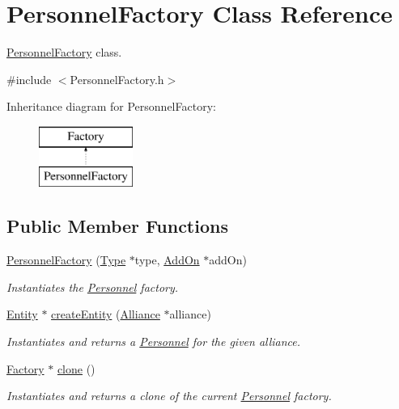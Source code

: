 \hypertarget{classPersonnelFactory}{}\section{Personnel\+Factory Class Reference}
\label{classPersonnelFactory}


\hyperlink{classPersonnelFactory}{Personnel\+Factory} class.  




{\ttfamily \#include $<$Personnel\+Factory.\+h$>$}

Inheritance diagram for Personnel\+Factory\+:\begin{figure}[H]
\begin{center}
\leavevmode
\includegraphics[height=2.000000cm]{classPersonnelFactory}
\end{center}
\end{figure}
\subsection*{Public Member Functions}
\begin{DoxyCompactItemize}
\item 
\hyperlink{classPersonnelFactory_a71cd406976230cacebfcfd723d2a2615}{Personnel\+Factory} (\hyperlink{classType}{Type} $\ast$type, \hyperlink{classAddOn}{Add\+On} $\ast$add\+On)
\begin{DoxyCompactList}\small\item\em Instantiates the \hyperlink{classPersonnel}{Personnel} factory. \end{DoxyCompactList}\item 
\hyperlink{classEntity}{Entity} $\ast$ \hyperlink{classPersonnelFactory_ae8684c246d5dfb1f469f368525867394}{create\+Entity} (\hyperlink{classAlliance}{Alliance} $\ast$alliance)
\begin{DoxyCompactList}\small\item\em Instantiates and returns a \hyperlink{classPersonnel}{Personnel} for the given alliance. \end{DoxyCompactList}\item 
\hyperlink{classFactory}{Factory} $\ast$ \hyperlink{classPersonnelFactory_ad60e8371e52153294112b16a7a97cc2d}{clone} ()
\begin{DoxyCompactList}\small\item\em Instantiates and returns a clone of the current \hyperlink{classPersonnel}{Personnel} factory. \end{DoxyCompactList}\end{DoxyCompactItemize}


